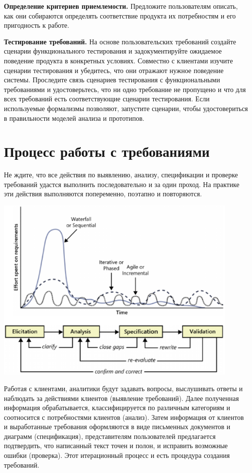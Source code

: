 \documentclass{../../text-style}
\begin{document}
\textbf{Определение критериев приемлемости.} Предложите пользователям описать, как они собираются определять соответствие продукта их потребностям и его пригодность к работе.

\textbf{Тестирование требований.} На основе пользовательских требований создайте сценарии функционального тестирования и задокументируйте ожидаемое поведение продукта в конкретных условиях. Совместно с клиентами изучите сценарии тестирования и убедитесь, что они отражают нужное поведение системы. Проследите связь сценариев тестирования с функциональными требованиями и удостоверьтесь, что ни одно требование не пропущено и что для всех требований есть соответствующие сценарии тестирования. Если используемые формализмы позволяют, запустите сценарии, чтобы удостовериться в правильности моделей анализа и прототипов.

\section{Процесс работы с требованиями}

Не ждите, что все действия по выявлению, анализу, спецификации и проверке требований удастся выполнить последовательно и за один проход. На практике эти действия выполняются попеременно, поэтапно и повторяются.

\begin{center}
    \includegraphics[width=0.9\textwidth]{requirementsProcess2.png}
\end{center}

Работая с клиентами, аналитики будут задавать вопросы, выслушивать ответы и наблюдать за действиями клиентов (выявление требований). Далее полученная информация обрабатывается, классифицируется по различным категориям и соотносится с потребностями клиентов (анализ). Затем информация от клиентов и выработанные требования оформляются в виде письменных документов и диаграмм (спецификация), представителям пользователей предлагается подтвердить, что написанный текст точен и полон, и исправить возможные ошибки (проверка). Этот итерационный процесс и есть процедура создания требований.
\end{document}
